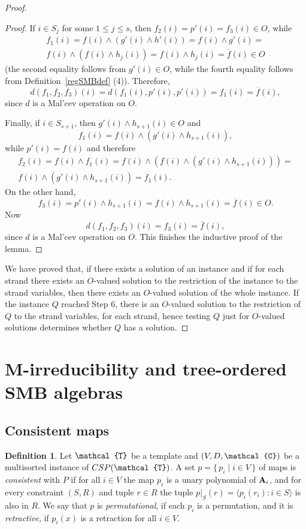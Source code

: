 \documentclass[11pt]{amsart}
\newcommand{\m}[1]{{\uppercase {\mathbf {#1}}}}
\newcommand{\vr}[1]{{\uppercase {\mathcal{#1}}}}
\newcommand{\lb}{\langle}
\newcommand{\rb}{\rangle}
\newcommand{\mt}{\wedge}
\theoremstyle{definition}
\newtheorem{df}[thm]{Definition}
\begin{document}
\begin{proof}
\begin{proof}
If $i\in S_j$ for some $1\leq j\leq s$, then $f_2(i)=p'(i)=f_3(i)\in O$, while 
$$
\begin{gathered}
f_1(i)=f(i)\mt (g'(i)\mt h'(i))=f(i)\mt g'(i)=\\
f(i)\mt(f(i)\mt h_j(i)) =f(i)\mt h_j(i)=\overline{f}(i)\in O
\end{gathered}
$$ (the second equality follows from $g'(i)\in O$, while the fourth equality follows from Definition~\ref{regSMBdef} (4)). Therefore, $$d(f_1,f_2,f_3)(i)=d(f_1(i),p'(i),p'(i))=f_1(i)=\overline{f}(i),$$ since $d$ is a Mal'cev operation on $O$.

Finally, if $i\in S_{s+1}$, then $g'(i)\mt h_{s+1}(i)\in O$ and $$f_1(i)=f(i)\mt(g'(i)\mt h_{s+1}(i)),$$ while $p'(i)=f(i)$ and therefore 
$$
\begin{gathered}
f_2(i)=f(i)\mt f_1(i)=f(i)\mt (f(i)\mt(g'(i)\mt h_{s+1}(i)))=\\
f(i)\mt(g'(i)\mt h_{s+1}(i))=f_1(i).
\end{gathered}
$$ 
On the other hand, $$f_3(i)=p'(i)\mt h_{s+1}(i)=f(i)\mt h_{s+1}(i)=\overline{f}(i)\in O.$$ Now $$d(f_1,f_2,f_3)(i)=f_3(i)=\overline{f}(i),$$ since $d$ is a Mal'cev operation on $O$. This finishes the inductive proof of the lemma.
\end{proof}
We have proved that, if there exists a solution of an instance and if for each strand there exists an $O$-valued solution to the restriction of the instance to the strand variables, then there exists an $O$-valued solution of the whole instance. If the instance $Q$ reached Step 6, there is an $O$-valued solution to the restriction of $Q$ to the strand variables, for each strand, hence testing $Q$ just for $O$-valued solutions determines whether $Q$ has a solution. 
\end{proof}

\section{M-irreducibility and tree-ordered SMB algebras}

\subsection{Consistent maps}

\begin{df}\label{consmaps}
Let $\vr t$ be a template and $(V,D,\vr c)$ be a multisorted instance of $CSP(\vr t)$. A set $p = \{\, p_i \mid i\in V \,\}$ of maps is {\em consistent} with $P$ if
for all $i\in V$ the map $p_i$ is a unary polynomial of $\m a_i$, and 
for every constraint $(S,R)$ and tuple $r\in R$ the tuple
$p|_S(r) = \lb p_i(r_i) : i\in S\rb$ is also in $R$.
We say that $p$ is {\em permutational}, if each $p_i$ is a permutation,
and it is {\em retractive}, if $p_i(x)$ is a retraction for all $i\in V$.
\end{df}
\end{document}
